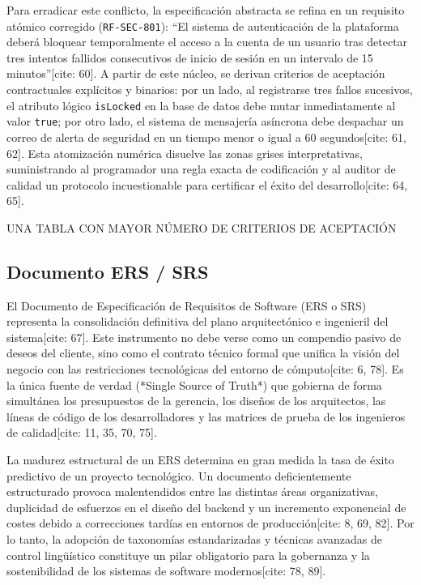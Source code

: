 \documentclass[11pt,a4paper]{article}
\begin{document}
	Para erradicar este conflicto, la especificación abstracta se refina en un requisito atómico corregido (\texttt{RF-SEC-801}): ``El sistema de autenticación de la plataforma deberá bloquear temporalmente el acceso a la cuenta de un usuario tras detectar tres intentos fallidos consecutivos de inicio de sesión en un intervalo de 15 minutos''[cite: 60]. A partir de este núcleo, se derivan criterios de aceptación contractuales explícitos y binarios: por un lado, al registrarse tres fallos sucesivos, el atributo lógico \texttt{isLocked} en la base de datos debe mutar inmediatamente al valor \texttt{true}; por otro lado, el sistema de mensajería asíncrona debe despachar un correo de alerta de seguridad en un tiempo menor o igual a 60 segundos[cite: 61, 62]. Esta atomización numérica disuelve las zonas grises interpretativas, suministrando al programador una regla exacta de codificación y al auditor de calidad un protocolo incuestionable para certificar el éxito del desarrollo[cite: 64, 65].
	
	UNA TABLA CON MAYOR NÚMERO DE CRITERIOS DE ACEPTACIÓN
	
	\subsection{Documento ERS / SRS}
	El Documento de Especificación de Requisitos de Software (ERS o SRS) representa la consolidación definitiva del plano arquitectónico e ingenieril del sistema[cite: 67]. Este instrumento no debe verse como un compendio pasivo de deseos del cliente, sino como el contrato técnico formal que unifica la visión del negocio con las restricciones tecnológicas del entorno de cómputo[cite: 6, 78]. Es la única fuente de verdad (*Single Source of Truth*) que gobierna de forma simultánea los presupuestos de la gerencia, los diseños de los arquitectos, las líneas de código de los desarrolladores y las matrices de prueba de los ingenieros de calidad[cite: 11, 35, 70, 75].
	
	La madurez estructural de un ERS determina en gran medida la tasa de éxito predictivo de un proyecto tecnológico. Un documento deficientemente estructurado provoca malentendidos entre las distintas áreas organizativas, duplicidad de esfuerzos en el diseño del backend y un incremento exponencial de costes debido a correcciones tardías en entornos de producción[cite: 8, 69, 82]. Por lo tanto, la adopción de taxonomías estandarizadas y técnicas avanzadas de control lingüístico constituye un pilar obligatorio para la gobernanza y la sostenibilidad de los sistemas de software modernos[cite: 78, 89].
	
\end{document}
